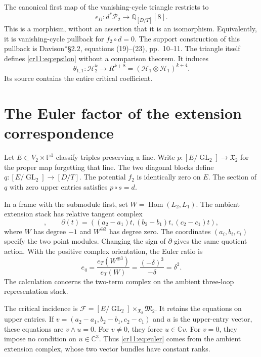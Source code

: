 The canonical first map of the vanishing-cycle triangle restricts to
\begin{equation}
 \epsilon_D:d^*\mathcal P_2\longrightarrow\mathbb Q_{[D/T]}[8].
 \label{cr11:eq:epsilon}
\end{equation}
This is a morphism, without an assertion that it is an isomorphism.
Equivalently, it is vanishing-cycle pullback for $f_2\circ d=0$.
The support construction of this pullback is
Davison\cite{cr11Davison}*{\S2.2, equations (19)--(23), pp.~10--11}.
The triangle itself defines \eqref{cr11:eq:epsilon} without a comparison theorem.
It induces
\begin{equation}
 \theta_{1,1}:\mathcal H_2^k\longrightarrow R^{k+8}
        =(\mathcal H_1\otimes\mathcal H_1)^{k+4}.
 \label{cr11:eq:theta}
\end{equation}
Its source contains the entire critical coefficient.

\section{The Euler factor of the extension correspondence}
\label{cr11:sec:euler}

Let $E\subset V_2\times\mathbb P^1$ classify triples preserving a line.
Write $p:[E/\operatorname{GL}_2]\to\mathfrak X_2$ for the proper map
forgetting that line.
The two diagonal blocks define
$q:[E/\operatorname{GL}_2]\to[D/T]$.
The potential $f_2$ is identically zero on $E$.
The section of $q$ with zero upper entries satisfies $p\circ s=d$.

In a frame with the submodule first, set
$W=\operatorname{Hom}(L_2,L_1)$.
The ambient extension stack has relative tangent complex
\begin{equation}
 [\,W\xrightarrow{\partial}W^{\oplus3}\,],\qquad
 \partial(t)=((a_2-a_1)t,(b_2-b_1)t,(c_2-c_1)t),
 \label{cr11:eq:extension}
\end{equation}
where $W$ has degree $-1$ and $W^{\oplus3}$ has degree zero.
The coordinates $(a_i,b_i,c_i)$ specify the two point modules.
Changing the sign of $\partial$ gives the same quotient action.
With the positive complex orientation, the Euler ratio is
\begin{equation}
 e_q=\frac{e_T(W^{\oplus3})}{e_T(W)}
       =\frac{(-\delta)^3}{-\delta}=\delta^2.
 \label{cr11:eq:euler}
\end{equation}
The calculation concerns the two-term complex on the ambient
three-loop representation stack.

The critical incidence is
$\mathcal F=[E/\operatorname{GL}_2]\times_{\mathfrak X_2}\mathfrak M_2$.
It retains the equations on upper entries.
If $v=(a_2-a_1,b_2-b_1,c_2-c_1)$ and $u$ is the upper-entry vector,
these equations are $v\wedge u=0$.
For $v\ne0$, they force $u\in\mathbb Cv$.
For $v=0$, they impose no condition on $u\in\mathbb C^3$.
Thus \eqref{cr11:eq:euler} comes from the ambient extension complex,
whose two vector bundles have constant ranks.

